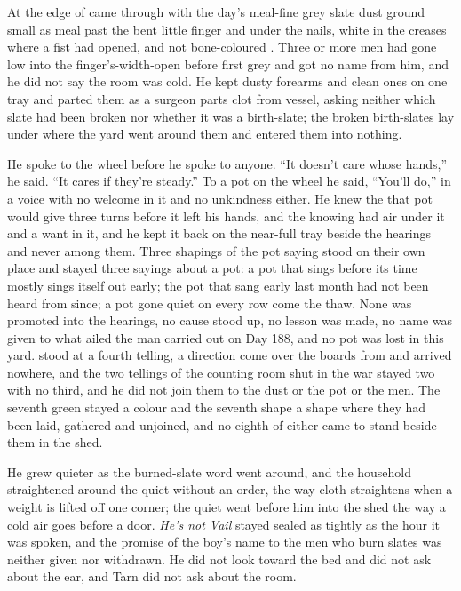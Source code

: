 At the edge of   came through with the day's meal-fine grey slate dust ground small as meal past the bent little finger and under the nails, white in the creases where a fist had opened, and not bone-coloured . Three or more men had gone low into the finger's-width-open  before first grey and got no name from him, and he did not say the room was cold. He kept dusty forearms and clean ones on one tray and parted them as a surgeon parts clot from vessel, asking neither which slate had been broken nor whether it was a birth-slate; the broken birth-slates lay under  where the yard went around them and entered them into nothing.

He spoke to the wheel before he spoke to anyone. “It doesn't care whose hands,” he said. “It cares if they're steady.” To a pot on the wheel he said, “You'll do,” in a voice with no welcome in it and no unkindness either. He knew the  that pot would give three turns before it left his hands, and the knowing had air under it and a want in it, and he kept it back on the near-full tray beside the hearings and never among them. Three shapings of the pot saying stood on their own place and stayed three sayings about a pot: a pot that sings before its time mostly sings itself out early; the pot that sang early last month had not been heard from since; a pot gone quiet on every row come the thaw. None was promoted into the hearings, no cause stood up, no lesson was made, no name was given to what ailed the man carried out on Day 188, and no pot was lost in this yard.  stood at a fourth telling, a direction come over the boards from  and arrived nowhere, and the two tellings of the counting room shut in the war stayed two with no third, and he did not join them to the dust or the pot or the men. The seventh green stayed a colour and the seventh shape a shape where they had been laid, gathered and unjoined, and no eighth of either came to stand beside them in the shed.

He grew quieter as the burned-slate word went around, and the household straightened around the quiet without an order, the way cloth straightens when a weight is lifted off one corner; the quiet went before him into the shed the way a cold air goes before a door. \emph{He's not Vail} stayed sealed as tightly as the hour it was spoken, and the promise of the boy's name to the men who burn slates was neither given nor withdrawn. He did not look toward the bed and did not ask about the ear, and Tarn did not ask about the room.

